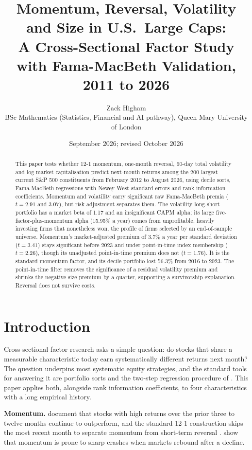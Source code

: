 \documentclass[11pt,a4paper]{article}
\title{\textbf{Momentum, Reversal, Volatility and Size in U.S.\ Large Caps:\\
A Cross-Sectional Factor Study with Fama-MacBeth Validation, 2011 to 2026}}
\author{Zack Higham\\[2pt]
\small BSc Mathematics (Statistics, Financial and AI pathway), Queen Mary University of London}
\date{September 2026; revised October 2026}
\begin{document}
\maketitle

\begin{abstract}
\noindent
This paper tests whether 12-1 momentum, one-month reversal, 60-day total volatility and log market capitalisation predict next-month returns among the 200 largest current S\&P 500 constituents from February 2012 to August 2026, using decile sorts, Fama-MacBeth regressions with Newey-West standard errors and rank information coefficients. Momentum and volatility carry significant raw Fama-MacBeth premia ($t = 2.91$ and $3.07$), but risk adjustment separates them. The volatility long-short portfolio has a market beta of 1.17 and an insignificant CAPM alpha; its large five-factor-plus-momentum alpha (15.95\% a year) comes from unprofitable, heavily investing firms that nonetheless won, the profile of firms selected by an end-of-sample universe. Momentum's market-adjusted premium of 3.7\% a year per standard deviation ($t = 3.41$) stays significant before 2023 and under point-in-time index membership ($t = 2.26$), though its unadjusted point-in-time premium does not ($t = 1.76$). It is the standard momentum factor, and its decile portfolio lost 56.3\% from 2016 to 2023. The point-in-time filter removes the significance of a residual volatility premium and shrinks the negative size premium by a quarter, supporting a survivorship explanation. Reversal does not survive costs.
\end{abstract}

\section{Introduction}

Cross-sectional factor research asks a simple question: do stocks that share a measurable characteristic today earn systematically different returns next month? The question underpins most systematic equity strategies, and the standard tools for answering it are portfolio sorts and the two-step regression procedure of \citet{fama1973}. This paper applies both, alongside rank information coefficients, to four characteristics with a long empirical history.

\textbf{Momentum.} \citet{jegadeesh1993} document that stocks with high returns over the prior three to twelve months continue to outperform, and the standard 12-1 construction skips the most recent month to separate momentum from short-term reversal \citep{carhart1997}. \citet{daniel2016} show that momentum is prone to sharp crashes when markets rebound after a decline.
\end{document}
